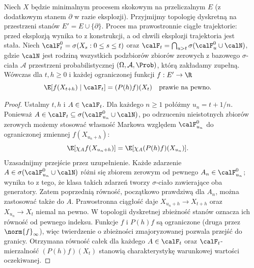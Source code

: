 \begin{lemat}
\label{lem:markov-aug}
Niech $X$ będzie minimalnym procesem skokowym
na przeliczalnym $E$ (z dodatkowym stanem $\partial$
w razie eksplozji). Przyjmijmy topologię dyskretną
na przestrzeni stanów $E'=E\cup\{\partial\}$.
Proces ma prawostronnie ciągłe trajektorie:
przed eksplozją wynika to z konstrukcji, a od chwili
eksplozji trajektoria jest stała. Niech $\calF_t^0=\sigma(X_s:0\le s\le t)$
oraz
$\calF_t=\bigcap_{u>t}\sigma(\calF_u^0\cup\calN)$,
gdzie $\calN$ jest rodziną wszystkich podzbiorów zbiorów
zerowych z bazowego $\sigma$-ciała $\mathcal A$
przestrzeni probabilistycznej $(\Omega,\mathcal A,\Prob)$,
którą zakładamy zupełną.
Wówczas dla $t,h\ge0$ i każdej ograniczonej funkcji $f:E'\to\R$
\[
\E[f(X_{t+h})\mid\calF_t]=(P(h)f)(X_t)
\quad\text{prawie na pewno}.
\]
\end{lemat}
\begin{proof}
Ustalmy $t,h$ i $A\in\calF_t$. Dla każdego $n\ge1$
połóżmy $u_n=t+1/n$. Ponieważ $A\in\calF_t\subseteq\sigma(\calF_{u_n}^0\cup\calN)$,
po odrzuceniu nieistotnych zbiorów zerowych możemy
stosować własność Markowa względem $\calF_{u_n}^0$
do ograniczonej zmiennej $f(X_{u_n+h})$:
\[
\E[\chi_A f(X_{u_n+h})]
 =\E[\chi_A(P(h)f)(X_{u_n})].
\]
Uzasadnijmy przejście przez uzupełnienie. Każde zdarzenie
$A\in\sigma(\calF_{u_n}^0\cup\calN)$ różni się
zbiorem zerowym od pewnego $A_n\in\calF_{u_n}^0$;
wynika to z tego, że klasa takich zdarzeń tworzy
$\sigma$-ciało zawierające oba generatory. Zatem
poprzednią równość, początkowo prawdziwą dla $A_n$,
można zastosować także do $A$.
Prawostronna ciągłość daje $X_{u_n+h}\to X_{t+h}$
oraz $X_{u_n}\to X_t$ niemal na pewno.
W topologii dyskretnej zbieżność stanów oznacza ich
równość od pewnego indeksu. Funkcje $f$ i $P(h)f$
są ograniczone (druga przez $\norm{f}_\infty$),
więc twierdzenie o zbieżności zmajoryzowanej pozwala
przejść do granicy.
Otrzymana równość całek dla każdego $A\in\calF_t$
oraz $\calF_t$-mierzalność $(P(h)f)(X_t)$
stanowią charakterystykę warunkowej wartości oczekiwanej.
\end{proof}

